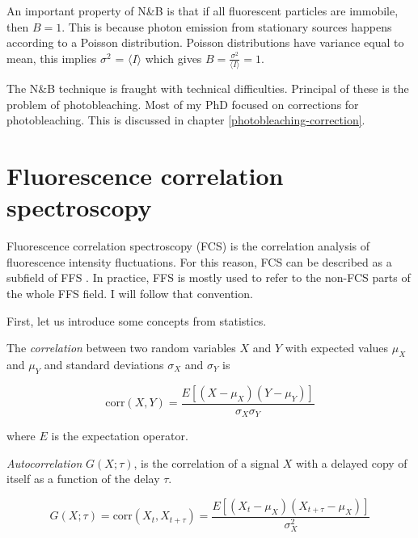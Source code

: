 \documentclass[12pt,]{book}
\theoremstyle{definition}
\theoremstyle{definition}
\theoremstyle{definition}
\theoremstyle{remark}
\let\BeginKnitrBlock\begin \let\EndKnitrBlock\end
\begin{document}
An important property of N\&B is that if all fluorescent particles are
immobile, then \(B = 1\). This is because photon emission from
stationary sources happens according to a Poisson distribution. Poisson
distributions have variance equal to mean, this implies \(\sigma^2\) =
\(\langle I \rangle\) which gives
\(B = \frac{\sigma^2}{\langle I \rangle} = 1\).

The N\&B technique is fraught with technical difficulties. Principal of
these is the problem of photobleaching. Most of my PhD focused on
corrections for photobleaching. This is discussed in chapter
\ref{photobleaching-correction}.

\section{Fluorescence correlation spectroscopy}\label{FCS}

Fluorescence correlation spectroscopy (FCS) is the correlation analysis
of fluorescence intensity fluctuations. For this reason, FCS can be
described as a subfield of FFS \citep{FFSnewage}. In practice, FFS is
mostly used to refer to the non-FCS parts of the whole FFS field. I will
follow that convention.

First, let us introduce some concepts from statistics.

\BeginKnitrBlock{definition}[statistics]
\protect\hypertarget{def:unnamed-chunk-18}{}{\label{def:unnamed-chunk-18}
\iffalse (statistics) \fi{} }The \emph{correlation} between two random
variables \(X\) and \(Y\) with expected values \(\mu_X\) and \(\mu_Y\)
and standard deviations \(\sigma_X\) and \(\sigma_Y\) is

\begin{equation}
\text{corr}(X, Y) = \frac{E[(X - \mu_X)(Y - \mu_Y)]}{\sigma_X \sigma_Y}
\label{eq:correlation}
\end{equation}

where \(E\) is the expectation operator.
\EndKnitrBlock{definition}

\BeginKnitrBlock{definition}[statistics]
\protect\hypertarget{def:unnamed-chunk-19}{}{\label{def:unnamed-chunk-19}
\iffalse (statistics) \fi{} }\emph{Autocorrelation} \(G(X; \tau)\), is
the correlation of a signal \(X\) with a delayed copy of itself as a
function of the delay \(\tau\).

\begin{equation}
G(X; \tau) = \text{corr}(X_t, X_{t + \tau}) = \frac{E[(X_t - \mu_X)(X_{t + \tau} - \mu_X)]}{\sigma^2_X}
\label{eq:autocorrelation}
\end{equation}
\EndKnitrBlock{definition}
\end{document}

